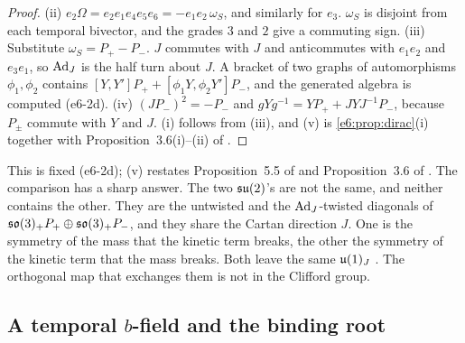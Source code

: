 \begin{proof}
(ii) $e_2\Omega=e_2e_1e_4e_5e_6=-e_1e_2\,\omega_S$, and similarly for $e_3$. $\omega_S$ is disjoint from each temporal bivector, and the grades $3$ and $2$
give a commuting sign. (iii) Substitute $\omega_S=P_+-P_-$. $J$ commutes with $J$ and anticommutes with $e_1e_2$ and $e_3e_1$, so
$\operatorname{Ad}_J$ is the half turn about $J$. A bracket of two graphs of automorphisms $\phi_1,\phi_2$ contains $[Y,Y']P_++[\phi_1Y,\phi_2Y']P_-$, and the
generated algebra is computed (e6-2d). (iv) $(JP_-)^2=-P_-$ and $gYg^{-1}=YP_++JYJ^{-1}P_-$, because $P_\pm$ commute with $Y$ and $J$. (i) follows from (iii),
and (v) is \cref{e6:prop:dirac}(i) together with Proposition~3.6(i)--(ii) of \cite{RE}.
\end{proof}

This is fixed (e6-2d); (v) restates Proposition~5.5 of \cite{ES17} and Proposition~3.6 of \cite{RE}. The comparison has a sharp answer.
The two $\mathfrak{su}(2)$'s are not the same, and neither contains the other. They are the untwisted and the $\operatorname{Ad}_J$-twisted diagonals of $\mathfrak{so}(3)_+P_+\oplus\mathfrak{so}(3)_+P_-$,
and they share the Cartan direction $J$. One is the symmetry of the mass that the kinetic term breaks, the other the symmetry of the kinetic term
that the mass breaks. Both leave the same $\mathfrak{u}(1)_J$ \cite{Pauli57,Gursey58}. The orthogonal map that exchanges them is not in the Clifford group.

\subsection{A temporal \texorpdfstring{$b$}{b}-field and the binding root}
\label{e6:sec:binding}


